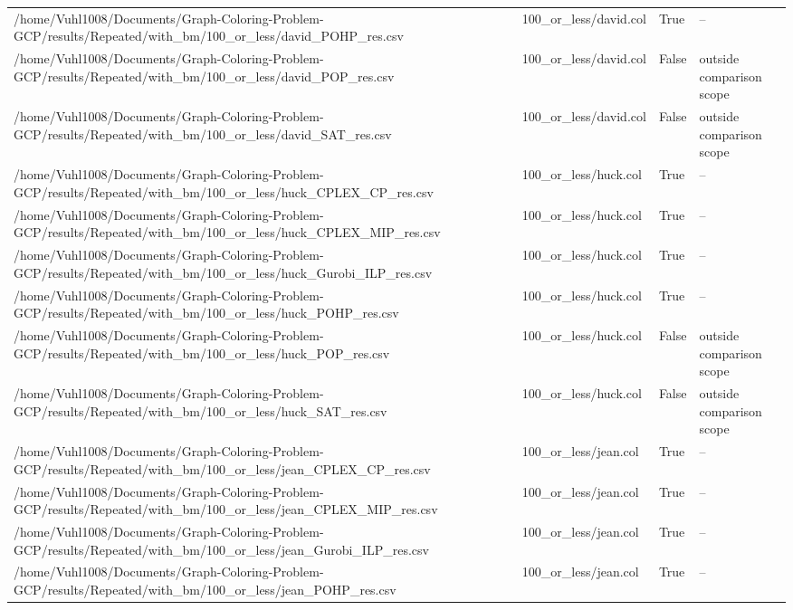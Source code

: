 \begin{table}[htbp]
\begin{tabular}{llll}
/home/Vuhl1008/Documents/Graph-Coloring-Problem-GCP/results/Repeated/with\_bm/100\_or\_less/david\_POHP\_res.csv & 100\_or\_less/david.col & True & -- \\
/home/Vuhl1008/Documents/Graph-Coloring-Problem-GCP/results/Repeated/with\_bm/100\_or\_less/david\_POP\_res.csv & 100\_or\_less/david.col & False & outside comparison scope \\
/home/Vuhl1008/Documents/Graph-Coloring-Problem-GCP/results/Repeated/with\_bm/100\_or\_less/david\_SAT\_res.csv & 100\_or\_less/david.col & False & outside comparison scope \\
/home/Vuhl1008/Documents/Graph-Coloring-Problem-GCP/results/Repeated/with\_bm/100\_or\_less/huck\_CPLEX\_CP\_res.csv & 100\_or\_less/huck.col & True & -- \\
/home/Vuhl1008/Documents/Graph-Coloring-Problem-GCP/results/Repeated/with\_bm/100\_or\_less/huck\_CPLEX\_MIP\_res.csv & 100\_or\_less/huck.col & True & -- \\
/home/Vuhl1008/Documents/Graph-Coloring-Problem-GCP/results/Repeated/with\_bm/100\_or\_less/huck\_Gurobi\_ILP\_res.csv & 100\_or\_less/huck.col & True & -- \\
/home/Vuhl1008/Documents/Graph-Coloring-Problem-GCP/results/Repeated/with\_bm/100\_or\_less/huck\_POHP\_res.csv & 100\_or\_less/huck.col & True & -- \\
/home/Vuhl1008/Documents/Graph-Coloring-Problem-GCP/results/Repeated/with\_bm/100\_or\_less/huck\_POP\_res.csv & 100\_or\_less/huck.col & False & outside comparison scope \\
/home/Vuhl1008/Documents/Graph-Coloring-Problem-GCP/results/Repeated/with\_bm/100\_or\_less/huck\_SAT\_res.csv & 100\_or\_less/huck.col & False & outside comparison scope \\
/home/Vuhl1008/Documents/Graph-Coloring-Problem-GCP/results/Repeated/with\_bm/100\_or\_less/jean\_CPLEX\_CP\_res.csv & 100\_or\_less/jean.col & True & -- \\
/home/Vuhl1008/Documents/Graph-Coloring-Problem-GCP/results/Repeated/with\_bm/100\_or\_less/jean\_CPLEX\_MIP\_res.csv & 100\_or\_less/jean.col & True & -- \\
/home/Vuhl1008/Documents/Graph-Coloring-Problem-GCP/results/Repeated/with\_bm/100\_or\_less/jean\_Gurobi\_ILP\_res.csv & 100\_or\_less/jean.col & True & -- \\
/home/Vuhl1008/Documents/Graph-Coloring-Problem-GCP/results/Repeated/with\_bm/100\_or\_less/jean\_POHP\_res.csv & 100\_or\_less/jean.col & True & -- \\

\end{tabular}
\end{table}
